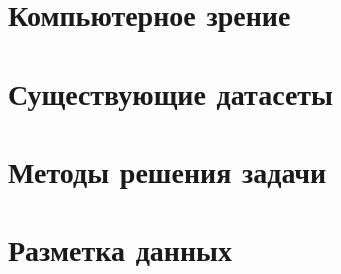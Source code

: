 \section{Компьютерное зрение} \label{sect1_2}


\section{Существующие датасеты} \label{sect1_2}


\section{Методы решения задачи} \label{sect1_3}


\section{Разметка данных} \label{sect1_4}
